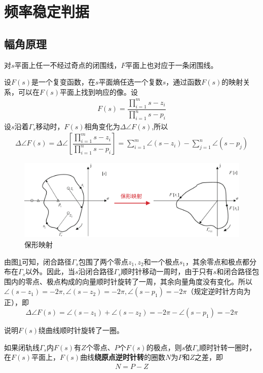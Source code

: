 \section{频率稳定判据}
\vspace*{-0.5em}
\subsection{幅角原理}
\ttheorem[保形映射定理]
对$s$平面上任一不经过奇点的闭围线，$F$平面上也对应于一条闭围线。

设$F(s)$是一个复变函数，在$s$平面熵任选一个复数$s$，通过函数$F(s)$的映射关系，可以在$F(s)$平面上找到响应的像。设
\begin{align}
	 F(s) = \dfrac{\displaystyle \prod_{i = 1}^{m}s - z_i}{\displaystyle \prod_{i=1}^{n} s- p_i}
\end{align}
设$s$沿着$\Gamma_s$移动时，$F(s)$相角变化为$\Delta \angle F(s) $,所以
\begin{align}
	\Delta \angle F(s) = \Delta \angle \left[\dfrac{\displaystyle \prod_{i = 1}^{m}s - z_i}{\displaystyle \prod_{i=1}^{n} s- p_i} \right]= \sum_{i = 1}^{m} \angle (s - z_i) - \sum_{j = 1}^{n} \angle (s - p_j)
\end{align}


\begin{figure}[!htb]
	\centering
	\includegraphics[width=0.85\linewidth]{pic/保形映射.pdf}
	\caption{保形映射}
	\label{保形映射}
\end{figure}

由图\ref{保形映射}可知，闭合路径$\Gamma_s$包围了两个零点$z_1,z_2$和一个极点$s_1$，其余零点和极点都分布在$\Gamma_s$以外。因此，当$s$沿闭合路径$\Gamma_s$顺时针移动一周时，由于只有$s$和闭合路径包围内的零点、极点构成的向量顺时针旋转了一周，其余向量角度没有变化。所以$\angle (s - z_1) = -2\pi, \angle (s - z_2) = -2 \pi, \angle (s - p_1) = -2 \pi$（规定逆时针方向为正），即
\[\Delta \angle F(s) = \angle (s - z_1) + \angle (s - z_2) = -2 \pi - \angle (s - p_1) = - 2 \pi\]

说明$F(s)$绕曲线顺时针旋转了一圈。

\theorem[幅角原理]
如果闭轨线$\Gamma_s$内$F(s)$有$Z$个零点、$P$个$F(s)$的极点，则$s$依$\Gamma_s$顺时针转一圈时，在$F(s)$平面上，$F(s)$曲线\textbf{绕原点逆时针转}的圈数$N$为$P$和$Z$之差，即
\begin{align}
	N = P - Z
\end{align}

